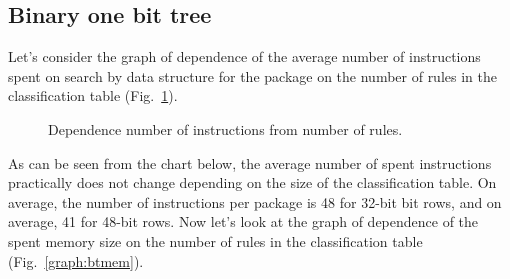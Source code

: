 \documentclass[conference]{IEEEtran}
\begin{document}
        \subsection{Binary one bit tree}
            Let's consider the graph of dependence of the average number of instructions spent 
            on search by data structure for the package on the number of rules in the classification table (Fig.~\ref{graph:btinst}).
            
            \begin{figure}[!htbp]
                \centering
                \captionsetup{justification=centering}
                \caption{Dependence number of instructions from number of rules.}
                \label{graph:btinst}
            \end{figure}
            As can be seen from the chart below, the average number of spent instructions
            practically does not change depending on the size of the classification table.
            On average, the number of instructions per package is 48 for 32-bit bit rows, and on average, 41 for 48-bit rows.
            Now let's look at the graph of dependence of the spent memory size 
            on the number of rules in the classification table (Fig.~\ref{graph:btmem}).
\end{document}
